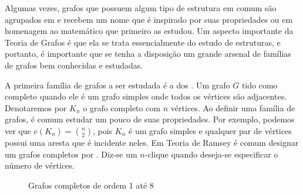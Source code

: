 Algumas vezes, grafos que possuem algum tipo de estrutura em comum são agrupados em  e recebem um nome que é inspirado por suas propriedades ou em homenagem ao matemático que primeiro as estudou. Um aspecto importante da Teoria de Grafos é que ela se trata essencialmente do estudo de estruturas, e portanto, é importante que se tenha a disposição um grande arsenal de famílias de grafos bem conhecidas e estudadas.

A primeira família de grafos a ser estudada é a dos . Um grafo $G$ tido como completo quando ele é um grafo simples onde todos os vértices são adjacentes. Denotaremos por $K_n$ o grafo completo com $n$ vértices. Ao definir uma família de grafos, é comum estudar um pouco de suas propriedades. Por exemplo, podemos ver que $e(K_n) = \binom{n}{2}$, pois $K_n$ é um grafo simples e qualquer par de vértices possui uma aresta que é incidente neles. Em Teoria de Ramsey é comum designar um grafos completos por . Diz-se um $n$-clique quando deseja-se especificar o número de vértices.

\begin{figure}[h!]
\centering
{}
\caption{Grafos completos de ordem 1 até 8}
\label{fig:iso}
\end{figure}

